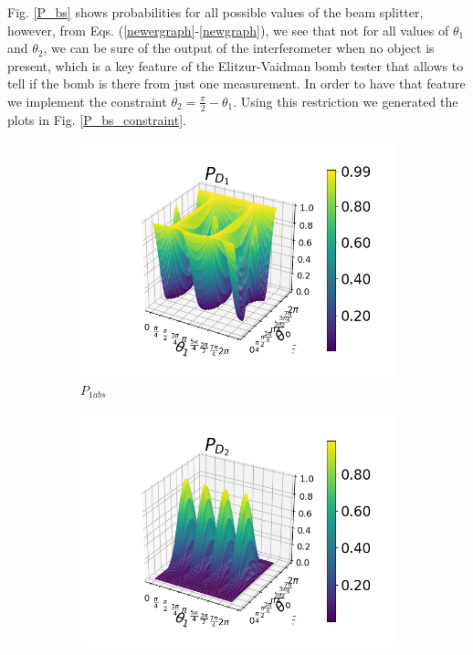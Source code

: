 \documentclass[12pt]{book}
\begin{document}
Fig. \ref{P_bs} shows probabilities for all possible values of the beam splitter, however, from Eqs. (\ref{newergraph}-\ref{newgraph}), we see that not for all values of $\theta_{1}$ and $\theta_{2}$, we can be sure of the output of the interferometer when no object is present, which is a key feature of the Elitzur-Vaidman bomb tester that allows to tell if the bomb is there from just one measurement. In order to have that feature we implement the constraint $\theta_{2}=\frac{\pi}{2}-\theta_{1}$. Using this restriction we generated the plots in Fig. \ref{P_bs_constraint}.
\begin{figure}[t!]
\centering
\begin{subfigure}[b]{0.45\linewidth}
\includegraphics[width=\linewidth]{images/PD1_BS_h.png}
\caption{$P_{1abs}$}
\label{fig:BS1}
\end{subfigure}
\begin{subfigure}[b]{0.45\linewidth}
\includegraphics[width=\linewidth]{images/PD2_BS_h.png}

\end{subfigure}
\end{figure}
\end{document}
